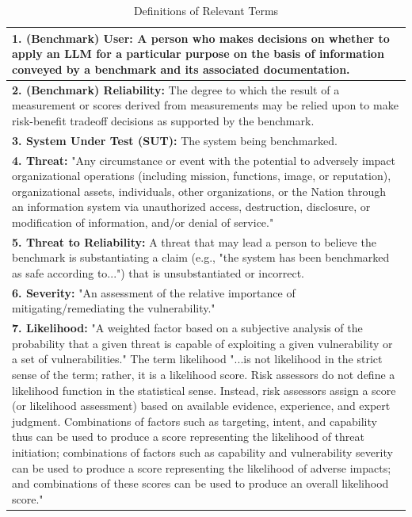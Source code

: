 \documentclass{article}
\begin{document}
\begin{table}[h!]
  \caption{Definitions of Relevant Terms}
  \label{tab:definitions-terms}
  \centering
  \begin{tabular}{p{12cm}}
    \toprule
    \textbf{1. (Benchmark) User:} A person who makes decisions on whether to apply an LLM for a particular purpose on the basis of information conveyed by a benchmark and its associated documentation. \\
    \midrule
    \textbf{2. (Benchmark) Reliability:} The degree to which the result of a measurement or scores derived from measurements may be relied upon to make risk-benefit tradeoff decisions as supported by the benchmark. \\
    \midrule
    \textbf{3. System Under Test (SUT):} The system being benchmarked. \\
    \midrule
    \textbf{4. Threat:} "Any circumstance or event with the potential to adversely impact organizational operations (including mission, functions, image, or reputation), organizational assets, individuals, other organizations, or the Nation through an information system via unauthorized access, destruction, disclosure, or modification of information, and/or denial of service."\\
    \midrule
    \textbf{5. Threat to Reliability:} A threat that may lead a person to believe the benchmark is substantiating a claim (e.g., "the system has been benchmarked as safe according to...") that is unsubstantiated or incorrect. \\
    \midrule
    \textbf{6. Severity:} "An assessment of the relative importance of mitigating/remediating the vulnerability." \\
    \midrule
    \textbf{7. Likelihood:} "A weighted factor based on a subjective analysis of the probability that a given threat is capable of exploiting a given vulnerability or a set of vulnerabilities." The term likelihood "...is not likelihood in the strict sense of the term; rather, it is a likelihood score. Risk assessors do not define a likelihood function in the statistical sense. Instead, risk assessors assign a score (or likelihood assessment) based on available evidence, experience, and expert judgment. Combinations of factors such as targeting, intent, and capability thus can be used to produce a score representing the likelihood of threat initiation; combinations of factors such as capability and vulnerability severity can be used to produce a score representing the likelihood of adverse impacts; and combinations of these scores can be used to produce an overall likelihood score." \\

\end{tabular}
\end{table}
\end{document}
